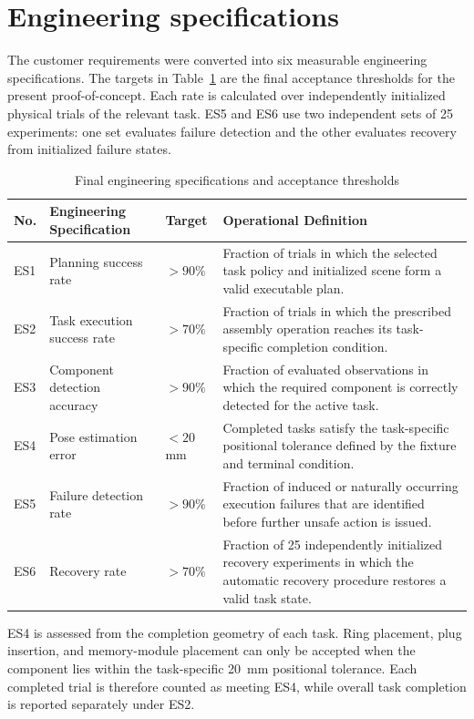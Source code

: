 \section{Engineering specifications}

The customer requirements were converted into six measurable engineering specifications. The targets in Table~\ref{tab:es} are the final acceptance thresholds for the present proof-of-concept. Each rate is calculated over independently initialized physical trials of the relevant task. ES5 and ES6 use two independent sets of 25 experiments: one set evaluates failure detection and the other evaluates recovery from initialized failure states.

\begin{table}[!htbp]
\centering
\caption{Final engineering specifications and acceptance thresholds}
\label{tab:es}
\small
\begin{tabularx}{\textwidth}{
  >{\centering\arraybackslash}p{}
  p{}
  >{\centering\arraybackslash}p{}
  X}
\toprule
\textbf{No.} & \textbf{Engineering Specification} & \textbf{Target} & \textbf{Operational Definition} \\
\midrule
ES1 & Planning success rate & $>90\%$ & Fraction of trials in which the selected task policy and initialized scene form a valid executable plan. \\
ES2 & Task execution success rate & $>70\%$ & Fraction of trials in which the prescribed assembly operation reaches its task-specific completion condition. \\
ES3 & Component detection accuracy & $>90\%$ & Fraction of evaluated observations in which the required component is correctly detected for the active task. \\
ES4 & Pose estimation error & $<20$\,mm & Completed tasks satisfy the task-specific positional tolerance defined by the fixture and terminal condition. \\
ES5 & Failure detection rate & $>90\%$ & Fraction of induced or naturally occurring execution failures that are identified before further unsafe action is issued. \\
ES6 & Recovery rate & $>70\%$ & Fraction of 25 independently initialized recovery experiments in which the automatic recovery procedure restores a valid task state. \\
\bottomrule
\end{tabularx}
\end{table}

ES4 is assessed from the completion geometry of each task. Ring placement,
plug insertion, and memory-module placement can only be accepted when the
component lies within the task-specific 20~mm positional tolerance. Each
completed trial is therefore counted as meeting ES4, while overall task
completion is reported separately under ES2.

